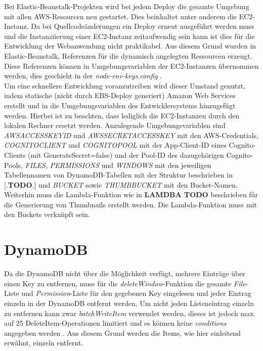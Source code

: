 \documentclass[a4paper, 12pt]{scrreprt}
\renewcommand\_{\textunderscore\allowbreak}
\begin{document}
Bei Elastic-Beanstalk-Projekten wird bei jedem Deploy die gesamte Umgebung mit allen AWS-Resourcen neu gestartet. Dies beinhaltet unter anderem die EC2-Instanz. Da bei Quellcodeänderungen ein Deploy erneut ausgeführt werden muss und die Instanziierung einer EC2-Instanz zeitaufwendig sein kann ist dies für die Entwicklung der Webanwendung nicht praktikabel. Aus diesem Grund wurden in Elastic-Beanstalk, Referenzen \cite{AWSDc} für die dynamisch angelegten Ressourcen erzeugt. Diese Referenzen können in Umgebungsvariablen der EC2-Instanzen übernommen werden, dies geschieht in der \textit{node-env-keys.config} \cite{AWSDd}.\\
Um eine schnellere Entwicklung voranzutreiben wird dieser Umstand genutzt, indem statische (nicht durch EBS-Deploy generiert) Amazon Web Services erstellt und in die Umgebungsvariablen des Entwicklersystems hinzugefügt werden.
Hierbei ist zu beachten, dass lediglich die EC2-Instanzen durch den lokalen Rechner ersetzt werden. Anzulegende Umgebungsvariablen sind
\textit{AWS\_ACCESS\_KEY\_ID} und \textit{AWS\_SECRET\_ACCESS\_KEY} mit den AWS-Credentials, \textit{COGNITO\_CLIENT} und \textit{COGNITO\_POOL} mit der App-Client-ID eines Cognito-Clients (mit GenerateSecret=false) und der Pool-ID des dazugehörigen Cognito-Pools, \textit{FILES}, \textit{PERMISSIONS} und \textit{WINDOWS} mit den jeweiligen Tabellennamen von DynamoDB-Tabellen mit der Struktur beschrieben in [.\textbf{TODO}.] und \textit{BUCKET} sowie \textit{THUMB\_BUCKET} mit den Bucket-Namen. Weiterhin muss die Lambda-Funktion wie in \textbf{LAMDBA TODO} beschrieben  für die Generierung von Thumbnails erstellt werden. Die Lambda-Funktion muss mit den Buckets verknüpft sein.  






\section{DynamoDB}
Da die DynamoDB nicht über die Möglichkeit verfügt, mehrere Einträge über einen Key zu entfernen, muss für die \textit{deleteWindow}-Funktion die gesamte \textit{File}-Liste und \textit{Permission}-Liste für den gegebenen Key eingelesen und jeder Eintrag einzeln in der DynamoDB entfernt werden.
Um nicht jeden Listeneintrag einzeln zu entfernen kann zwar \textit{batchWriteItem} verwendet werden, dieses ist jedoch max. auf 25 DeleteItem-Operationen limitiert und es können keine \textit{conditions} angegeben werden \cite{AWSJSSDKD}. Aus diesem Grund werden die Items, wie hier einleitend erwähnt, einzeln entfernt.
\end{document}

